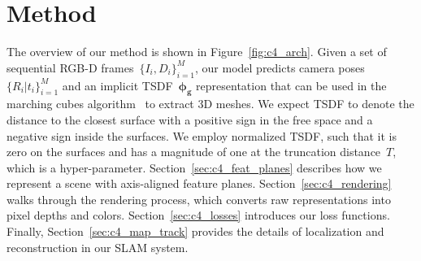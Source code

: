\section{Method}
The overview of our method is shown in Figure~\ref{fig:c4_arch}. Given a set of sequential RGB-D frames~$\{I_{i}, D_{i}\}_{i=1}^M$, our model predicts camera poses~$\{R_{i}| t_{i}\}_{i=1}^M$ and an implicit TSDF~$\boldsymbol{\phi_{g}}$ representation that can be used in the marching cubes algorithm~\citep{lorensen1987marching} to extract 3D meshes. We expect TSDF to denote the distance to the closest surface with a positive sign in the free space and a negative sign inside the surfaces. We employ normalized TSDF, such that it is zero on the surfaces and has a magnitude of one at the truncation distance~$T$, which is a hyper-parameter. Section~\ref{sec:c4_feat_planes} describes how we represent a scene with axis-aligned feature planes. Section~\ref{sec:c4_rendering} walks through the rendering process, which converts raw representations into pixel depths and colors. Section~\ref{sec:c4_losses} introduces our loss functions. Finally, Section~\ref{sec:c4_map_track} provides the details of localization and reconstruction in our SLAM system.

